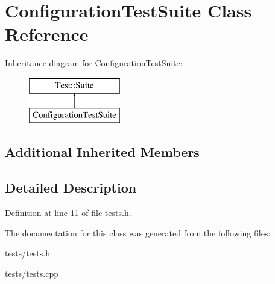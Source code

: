 \hypertarget{class_configuration_test_suite}{}\section{Configuration\+Test\+Suite Class Reference}
\label{class_configuration_test_suite}
Inheritance diagram for Configuration\+Test\+Suite\+:\begin{figure}[H]
\begin{center}
\leavevmode
\includegraphics[height=2.000000cm]{class_configuration_test_suite}
\end{center}
\end{figure}
\subsection*{Additional Inherited Members}


\subsection{Detailed Description}


Definition at line 11 of file tests.\+h.



The documentation for this class was generated from the following files\+:\begin{DoxyCompactItemize}
\item 
tests/tests.\+h\item 
tests/tests.\+cpp\end{DoxyCompactItemize}

